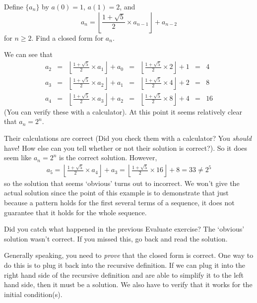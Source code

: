 \begin{eval}
Define $\{a_n\}$ by $a(0)=1$, $a(1)=2$, and 
$$a_n=\left\lfloor \frac{1+\sqrt{5}}{2}\times a_{n-1}\right\rfloor+a_{n-2}$$
for $n\geq 2$.  Find a closed form for $a_n$.
\begin{ssol}
We can see that 
$$\begin{array}{lllllll} 
a_2 & = & \left\lfloor \frac{1+\sqrt{5}}{2}\times a_1\right\rfloor+a_0&=
& \left\lfloor \frac{1+\sqrt{5}}{2}\times 2\right\rfloor+1&=&4\\[1ex]
a_3 & = &\left\lfloor \frac{1+\sqrt{5}}{2}\times a_2\right\rfloor+a_1&=
& \left\lfloor \frac{1+\sqrt{5}}{2}\times 4\right\rfloor+2&=&8 \\[1ex]
a_4 & = &\left\lfloor \frac{1+\sqrt{5}}{2}\times a_3\right\rfloor+a_2&=
& \left\lfloor \frac{1+\sqrt{5}}{2}\times 8\right\rfloor+4&=&16
\end{array}
$$
(You can verify these with a calculator).
At this point it seems relatively clear that $a_n=2^n$.  
\end{ssol}
\evallinetwo
\begin{answer}
Their calculations are correct (Did you check them with a calculator?  You {\em should} have!
How else can you tell whether or not their solution is correct?).
So it does seem like $a_n=2^n$ is the correct solution.
However, 
$$\begin{array}{lllllll} 
a_5  = \left\lfloor \frac{1+\sqrt{5}}{2}\times a_4\right\rfloor+a_3=
 \left\lfloor \frac{1+\sqrt{5}}{2}\times 16\right\rfloor+8=33\neq 2^5
\end{array}$$
so the solution that seems `obvious' turns out to incorrect.
We won't give the actual solution since the point of this example is to demonstrate
that just because a pattern holds for the first several terms of a sequence, it does not
guarantee that it holds for the whole sequence.
\end{answer}
\end{eval}

Did you catch what happened in the previous Evaluate exercise?  The `obvious' solution
wasn't correct.  If you missed this, go back and read the solution. 

Generally speaking, you need to {\em prove} that the closed form is correct.
One way to do this is to plug it back into the recursive definition.
If we can plug it into the right hand side of the recursive definition and are able to simplify it to
the left hand side, then it must be a solution.  We also have to verify that it works for the
initial condition(s).

